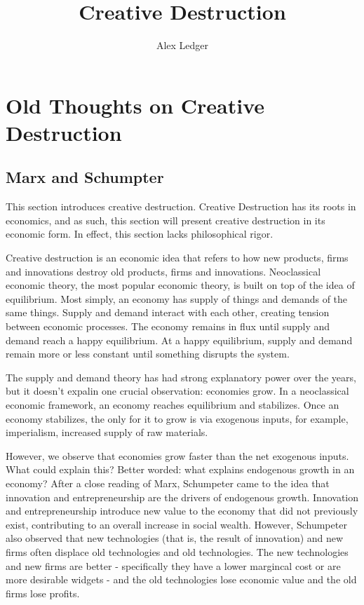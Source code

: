 \documentclass[11pt]{article}
\title{Creative Destruction}
\author{Alex Ledger}
\begin{document}
\maketitle

\section{Old Thoughts on Creative Destruction}
\subsection{Marx and Schumpter}
This section introduces creative destruction.
Creative Destruction has its roots in economics, and as such, this section will present creative destruction in its economic form.
In effect, this section lacks philosophical rigor.

Creative destruction is an economic idea that refers to how new products, firms and innovations destroy old products, firms and innovations.
Neoclassical economic theory, the most popular economic theory, is built on top of the idea of equilibrium.
Most simply, an economy has supply of things and demands of the same things. 
Supply and demand interact with each other, creating tension between economic processes.
The economy remains in flux until supply and demand reach a happy equilibrium.
At a happy equilibrium, supply and demand remain more or less constant until something disrupts the system.

The supply and demand theory has had strong explanatory power over the years, but it doesn't expalin one crucial observation: economies grow.
In a neoclassical economic framework, an economy reaches equilibrium and stabilizes.
Once an economy stabilizes, the only for it to grow is via exogenous inputs, for example, imperialism, increased supply of raw materials.

However, we observe that economies grow faster than the net exogenous inputs.
What could explain this?
Better worded: what explains endogenous growth in an economy?
After a close reading of Marx, Schumpeter came to the idea that innovation and entrepreneurship are the drivers of endogenous growth.
Innovation and entrepreneurship introduce new value to the economy that did not previously exist, contributing to an overall increase in social wealth.
However, Schumpeter also observed that new technologies (that is, the result of innovation)  and new firms often displace old technologies and old technologies.
The new technologies and new firms are better - specifically they have a lower margincal cost or are more desirable widgets - and the old technologies lose economic value and the old firms lose profits.
\end{document}
